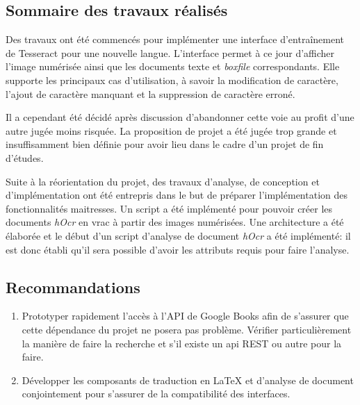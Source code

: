 \subsection{Sommaire des travaux réalisés}
Des travaux ont été commencés pour implémenter une interface d'entraînement de Tesseract pour une nouvelle langue. L'interface permet à ce jour d'afficher l'image numérisée ainsi que les documents texte et \emph{boxfile} correspondants. Elle supporte les principaux cas d'utilisation, à savoir la modification de caractère, l'ajout de caractère manquant et la suppression de caractère erroné.

Il a cependant été décidé après discussion d'abandonner cette voie au profit d'une autre jugée moins risquée. La proposition de projet a été jugée trop grande et insuffisamment bien définie pour avoir lieu dans le cadre d'un projet de fin d'études.

Suite à la réorientation du projet, des travaux d'analyse, de conception et d'implémentation ont été entrepris dans le but de préparer l'implémentation des fonctionnalités maitresses. Un script a été implémenté pour pouvoir créer les documents \emph{hOcr} en vrac à partir des images numérisées. Une architecture a été élaborée et le début d'un script d'analyse de document \emph{hOcr} a été implémenté: il est donc établi qu'il sera possible d'avoir les attributs requis pour faire l'analyse.
\subsection{Recommandations}
\begin{enumerate}
    \item Prototyper rapidement l'accès à l'API de Google Books afin de s'assurer que cette dépendance du projet ne posera pas problème. Vérifier particulièrement la manière de faire la recherche et s'il existe un api REST ou autre pour la faire.
    \item Développer les composants de traduction en LaTeX et d'analyse de document conjointement pour s'assurer de la compatibilité des interfaces.
\end{enumerate}


